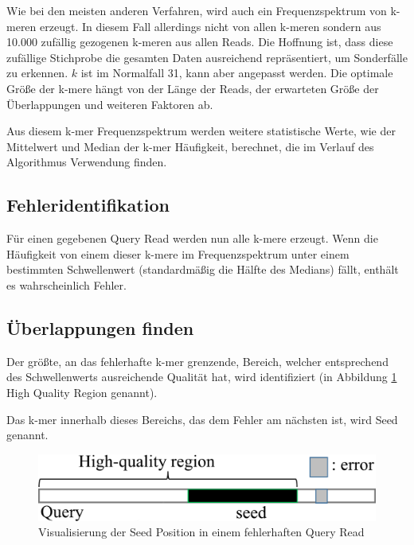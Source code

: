 Wie bei den meisten anderen Verfahren, wird auch ein Frequenzspektrum von k-meren erzeugt.
In diesem Fall allerdings nicht von allen k-meren sondern aus 10.000 zufällig gezogenen k-meren aus allen Reads.
Die Hoffnung ist, dass diese zufällige Stichprobe die gesamten Daten ausreichend repräsentiert, um Sonderfälle zu erkennen.
$k$ ist im Normalfall 31, kann aber angepasst werden.
Die optimale Größe der k-mere hängt von der Länge der Reads, der erwarteten Größe der Überlappungen und weiteren Faktoren ab.

Aus diesem k-mer Frequenzspektrum werden weitere statistische Werte, wie der Mittelwert und Median der k-mer Häufigkeit, berechnet, die im Verlauf des Algorithmus Verwendung finden.


\subsection{Fehleridentifikation}
\label{subsec:fehleridentifikation}

Für einen gegebenen Query Read werden nun alle k-mere erzeugt.
Wenn die Häufigkeit von einem dieser k-mere im Frequenzspektrum unter einem bestimmten Schwellenwert (standardmäßig die Hälfte des Medians) fällt, enthält es wahrscheinlich Fehler.


\subsection{Überlappungen finden}
\label{subsec:ueberlappungen-finden}

Der größte, an das fehlerhafte k-mer grenzende, Bereich, welcher entsprechend des Schwellenwerts ausreichende Qualität hat, wird identifiziert (in Abbildung \ref{fig:seed} High Quality Region genannt). 

Das k-mer innerhalb dieses Bereichs, das dem Fehler am nächsten ist, wird Seed genannt.

\begin{figure}[h]
	\begin{center}
		\includegraphics[]{./img/seed.png}
	\end{center}
	\caption{Visualisierung der Seed Position in einem fehlerhaften Query Read}
	\label{fig:seed}
\end{figure}

